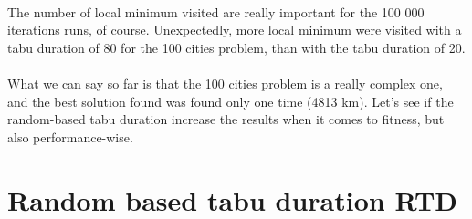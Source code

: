 \documentclass[12pt,oneside,a4paper]{article}
\begin{document}
\paragraph{}The number of local minimum visited are really important for the 100 000 iterations runs, 
of course. Unexpectedly, more local minimum were visited with a tabu duration of 80 for 
the 100 cities problem, than with the tabu duration of 20.
\paragraph{}What we can say so far is that the 100 cities problem is a really complex one, and the best 
solution found was found only one time (4813 km). Let’s see if the random-based tabu duration
 increase the results when it comes to fitness, but also performance-wise.

\section{Random based tabu duration RTD}
\end{document}
